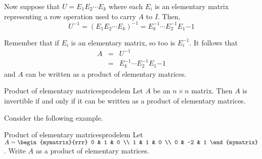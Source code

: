 Now suppose that $U = E_1 E_2 \cdots E_k$ where each $E_i$ is an elementary matrix representing a row operation used to carry $A$ to $I$. Then, 
\[
U^{-1} = \left( E_1 E_2 \cdots E_k \right) ^{-1}  =  E_k^{-1} \cdots E_2^{-1} E_1{-1} 
\]

Remember that if $E_i$ is an elementary matrix, so too is $E_i^{-1}$. 
It follows that 
\begin{eqnarray*}
A&=& U^{-1} \\
&=&  E_k^{-1} \cdots E_2^{-1} E_1{-1}
\end{eqnarray*}
and $A$ can be written as a product of elementary matrices. 

\begin{theorem}{Product of elementary matrices}{prodelem}
Let $A$ be an $n \times n$ matrix. Then $A$ is invertible if and only if it can be written as a product of elementary matrices.
\end{theorem}

Consider the following example.

\begin{example}{Product of elementary matrices}{prodelem}
Let $A = \begin{mymatrix}{rrr}
0 & 1 & 0 \\
1 & 1 & 0 \\
0 & -2 & 1 
\end{mymatrix}$. 
Write $A$ as a product of elementary matrices. 
\end{example}

